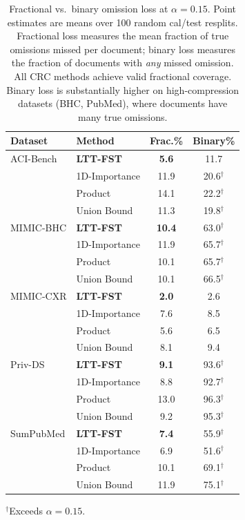 \begin{table}[t]
\centering
\small
\caption{Fractional vs.\ binary omission loss at $\alpha=0.15$. Point estimates are means over 100 random cal/test resplits. Fractional loss measures the mean fraction of true omissions missed per document; binary loss measures the fraction of documents with \emph{any} missed omission. All CRC methods achieve valid fractional coverage. Binary loss is substantially higher on high-compression datasets (BHC, PubMed), where documents have many true omissions.}
\label{tab:binary-vs-fractional}
\begin{tabular}{ll cc}
\toprule
Dataset & Method & Frac.\% & Binary\% \\
\midrule
  ACI-Bench & \textbf{LTT-FST} & \textbf{5.6} & 11.7 \\
   & 1D-Importance & 11.9 & 20.6$^\dagger$ \\
   & Product & 14.1 & 22.2$^\dagger$ \\
   & Union Bound & 11.3 & 19.8$^\dagger$ \\
\midrule
  MIMIC-BHC & \textbf{LTT-FST} & \textbf{10.4} & 63.0$^\dagger$ \\
   & 1D-Importance & 11.9 & 65.7$^\dagger$ \\
   & Product & 10.1 & 65.7$^\dagger$ \\
   & Union Bound & 10.1 & 66.5$^\dagger$ \\
\midrule
  MIMIC-CXR & \textbf{LTT-FST} & \textbf{2.0} & 2.6 \\
   & 1D-Importance & 7.6 & 8.5 \\
   & Product & 5.6 & 6.5 \\
   & Union Bound & 8.1 & 9.4 \\
\midrule
  Priv-DS & \textbf{LTT-FST} & \textbf{9.1} & 93.6$^\dagger$ \\
   & 1D-Importance & 8.8 & 92.7$^\dagger$ \\
   & Product & 13.0 & 96.3$^\dagger$ \\
   & Union Bound & 9.2 & 95.3$^\dagger$ \\
\midrule
  SumPubMed & \textbf{LTT-FST} & \textbf{7.4} & 55.9$^\dagger$ \\
   & 1D-Importance & 6.9 & 51.6$^\dagger$ \\
   & Product & 10.1 & 69.1$^\dagger$ \\
   & Union Bound & 11.9 & 75.1$^\dagger$ \\
\bottomrule
\end{tabular}
\vspace{2pt}
\par\small $^\dagger$Exceeds $\alpha=0.15$.
\end{table}
